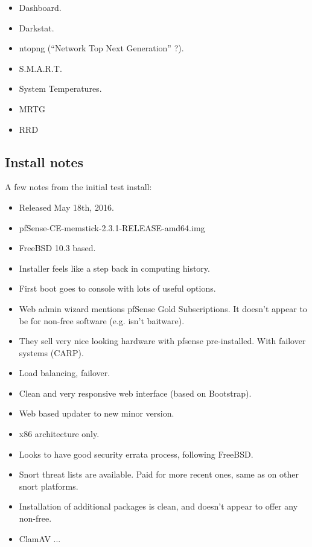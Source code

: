 \begin{itemize}
 \item Dashboard.
 \item Darkstat.
 \item ntopng (``Network Top Next Generation'' ?).
 \item S.M.A.R.T.
 \item System Temperatures.
 \item MRTG
 \item RRD
\end{itemize}


\subsection{Install notes}

A few notes from the initial test install:

\begin{itemize}
 \item Released May 18th, 2016.
 \item pfSense-CE-memstick-2.3.1-RELEASE-amd64.img
 \item FreeBSD 10.3 based.
 \item Installer feels like a step back in computing history.
 \item First boot goes to console with lots of useful options.
 \item Web admin wizard mentions pfSense Gold Subscriptions. It doesn't appear to be for non-free software (e.g. isn't baitware).
 \item They sell very nice looking hardware with pfsense pre-installed. With failover systems (CARP).
 \item Load balancing, failover.
 \item Clean and very responsive web interface (based on Bootstrap).
 \item Web based updater to new minor version.
 \item x86 architecture only.
 \item Looks to have good security errata process, following FreeBSD.
 \item Snort threat lists are available. Paid for more recent ones, same as on other snort platforms.
 \item Installation of additional packages is clean, and doesn't appear to offer any non-free.
 \item ClamAV ...
\end{itemize}


